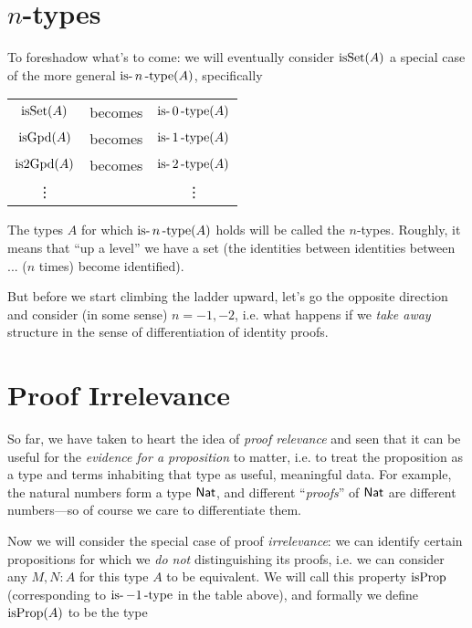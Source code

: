 \documentclass[11pt]{article}
\begin{document}
\section{$n$-types}

To foreshadow what's to come: we will eventually consider $\operatorname{isSet}(A)$ a
special case of the more general $\operatorname{is-}n\operatorname{-type}(A)$, specifically

\newcommand{\isntype}[1]{\op{is-}{#1}\op{-type}}

\begin{tabular}{ccc}
$\operatorname{isSet}(A)$ & becomes & $\isntype{0}(A)$ \\
$\operatorname{isGpd}(A)$ & becomes & $\isntype{1}(A)$ \\
$\operatorname{is2Gpd}(A)$ & becomes & $\isntype{2}(A)$ \\
\vdots & & \vdots
\end{tabular}
\bigskip

The types $A$ for which $\operatorname{is-}n\operatorname{-type}(A)$ holds will be called the
$n$-types. Roughly, it means that ``up a level'' we have a set (the
identities between identities between ... ($n$ times) become identified).

But before we start climbing the ladder upward, let's go the opposite
direction and consider (in some sense) $n=-1, -2$, i.e. what happens if we
{\em take away} structure in the sense of differentiation of identity
proofs.

\section{Proof Irrelevance}

So far, we have taken to heart the idea of {\em proof relevance} and seen
that it can be useful for the {\em evidence for a proposition} to matter,
i.e. to treat the proposition as a type and terms inhabiting that type as
useful, meaningful data. For example, the natural numbers form a type
$\mathsf{Nat}$, and different ``{\em proofs}'' of $\mathsf{Nat}$ are different
numbers---so of course we care to differentiate them.

Now we will consider the special case of proof {\em irrelevance}: we can
identify certain propositions for which we {\em do not}
distinguishing its proofs, i.e. we can consider any $M, N : A$ for this type
$A$ to be equivalent. We will call this property $\operatorname{isProp}$
(corresponding to $\operatorname{is-}-1\operatorname{-type}$ in the table above), and formally
we define $\operatorname{isProp}(A)$ to be the type
\end{document}
